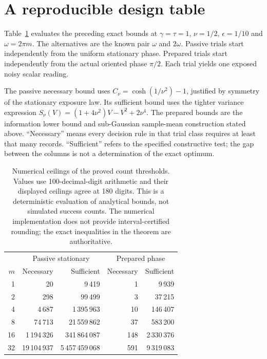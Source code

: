 \section{A reproducible design table}
\label{sec:dg-design-table}

Table~\ref{tab:dg-count-design} evaluates the preceding exact bounds at
$\gamma=\tau=1$, $\nu=1/2$, $\epsilon=1/10$ and
$\omega=2\pi m$. The alternatives are the known pair $\omega$ and
$2\omega$. Passive trials start independently from the uniform stationary
phase. Prepared trials start independently from the actual oriented phase
$\pi/2$. Each trial yields one exposed noisy scalar reading.

The passive necessary bound uses
$C_\nu=\cosh(1/\nu^2)-1$, justified by symmetry of the stationary exposure
law. Its sufficient bound uses the tighter variance expression
$S_\nu(V)=(1+4\nu^2)V-V^2+2\nu^4$. The prepared bounds are the information
lower bound and sub-Gaussian sample-mean construction stated above.
``Necessary'' means every decision rule in that trial class requires at least
that many records. ``Sufficient'' refers to the specified constructive test;
the gap between the columns is not a determination of the exact optimum.

\begin{table}[htbp]
\centering
\begin{tabular}{r|rr|rr}
\hline
 & \multicolumn{2}{c|}{Passive stationary} & \multicolumn{2}{c}{Prepared phase}\\
$m$ & Necessary & Sufficient & Necessary & Sufficient\\
\hline
1 & 20 & 9\,419 & 1 & 9\,939\\
2 & 298 & 99\,499 & 3 & 37\,215\\
4 & 4\,687 & 1\,395\,963 & 10 & 146\,407\\
8 & 74\,713 & 21\,559\,862 & 37 & 583\,200\\
16 & 1\,194\,326 & 341\,864\,087 & 148 & 2\,330\,376\\
32 & 19\,104\,937 & 5\,457\,459\,068 & 591 & 9\,319\,083\\
\hline
\end{tabular}
\caption{Numerical ceilings of the proved count thresholds. Values use
100-decimal-digit arithmetic and their displayed ceilings agree at 180 digits.
This is a deterministic evaluation of analytical bounds, not simulated
success counts. The numerical implementation does not provide interval-certified
rounding; the exact inequalities in the theorem are authoritative.}
\label{tab:dg-count-design}
\end{table}

